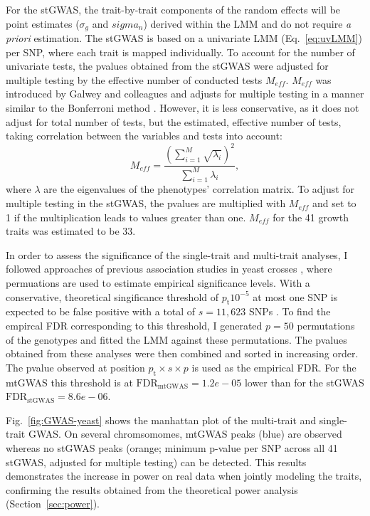 For the stGWAS, the trait-by-trait components of the random effects will be point estimates (\(\sigma_g\) and \(sigma_n\)) derived within the LMM and do not require \textit{a priori} estimation. The stGWAS is based on a univariate LMM (Eq.~\ref{eq:uvLMM}) per SNP, where each trait is mapped individually. To account for the number of univariate tests, the pvalues obtained from the stGWAS were adjusted for multiple testing by the effective number of conducted tests \(M_{eff}\). \(M_{eff}\) was introduced by Galwey and colleagues \citeyear{Galwey2009} and adjusts for multiple testing in a manner similar to the Bonferroni method \citep{Dunn1961}. However, it is less conservative, as it does not adjust for total number of tests, but the estimated, effective number of tests, taking correlation between the 
variables and tests into account:
\begin{equation}
 M_{eff} = \frac{(\sum^M_{i=1} \sqrt{\lambda_i})^2}{\sum^M_{i=1}\lambda_i},
\end{equation}
 where \(\lambda\) are the eigenvalues of the phenotypes' correlation matrix. To adjust for multiple testing in the stGWAS, the pvalues are multiplied with \(M_{eff}\) and set to 1 if the multiplication leads to values greater than one. \(M_{eff}\) for the 41 growth traits was estimated to be 33. 
 
In order to assess the significance of the single-trait and multi-trait analyses, I followed approaches of previous association studies in yeast crosses \citep{Brem2002,Brem2005,Ehrenreich2010}, where permuations are used to estimate empirical significance levels. With a conservative, theoretical singificance threshold of \(p_\text{t}10^{-5}\) at most one SNP is expected to be false positive with a total of \(s = 11,623\) SNPs . To find the empircal FDR corresponding to this threshold, I generated \(p = 50\) permutations of the genotypes and fitted the LMM against these permutations. The pvalues obtained from these analyses were then combined and sorted in increasing order. The pvalue observed at position \(p_\text{t} \times s \times p\) is used as the empirical FDR. For the mtGWAS this threshold is at \(\text{FDR}_{\text{mtGWAS}} =1.2e-05\)  lower than for the stGWAS \(\text{FDR}_{\text{stGWAS}} =8.6e-06\).

Fig.~\ref{fig:GWAS-yeast} shows the manhattan plot of the multi-trait and single-trait GWAS. On several chromsomomes, mtGWAS peaks (blue) are observed whereas no stGWAS peaks (orange; minimum p-value per SNP across all 41 stGWAS, adjusted for multiple testing) can be detected. This results demonstrates the increase in power on real data when jointly modeling the traits, confirming the results obtained from the theoretical power analysis (Section~\ref{sec:power}). 

